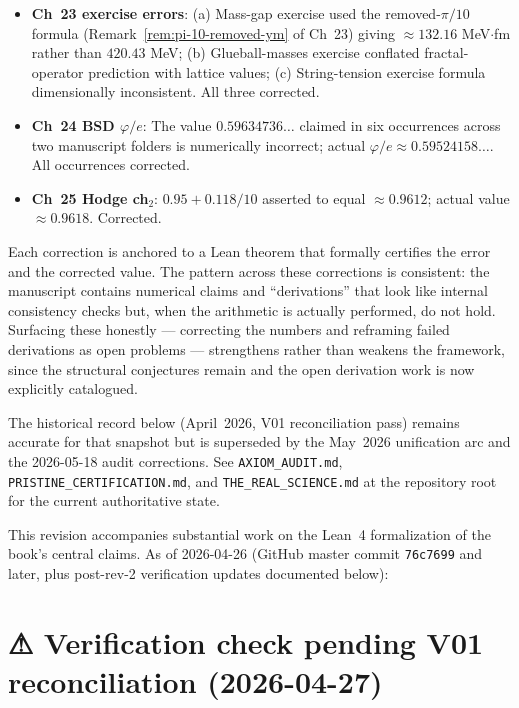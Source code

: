 \begin{itemize}
  Emergence double error (empirical ratio $0.5988 \neq (\sqrt{5}-1)/3$).
  All four corrected. (e) New $M_0$-narrowing remark inserted.
\item \textbf{Ch~23 exercise errors}: (a) Mass-gap exercise used the
  removed-$\pi/10$ formula (Remark~\ref{rem:pi-10-removed-ym} of Ch~23)
  giving $\approx 132.16$ MeV$\cdot$fm rather than $420.43$ MeV; (b)
  Glueball-masses exercise conflated fractal-operator prediction with
  lattice values; (c) String-tension exercise formula dimensionally
  inconsistent. All three corrected.
\item \textbf{Ch~24 BSD $\varphi/e$}: The value $0.59634736\ldots$
  claimed in six occurrences across two manuscript folders is
  numerically incorrect; actual $\varphi/e \approx 0.59524158\ldots$.
  All occurrences corrected.
\item \textbf{Ch~25 Hodge ch$_2$}: $0.95 + 0.118/10$ asserted to equal
  $\approx 0.9612$; actual value $\approx 0.9618$. Corrected.
\end{itemize}

\noindent Each correction is anchored to a Lean theorem that formally
certifies the error and the corrected value. The pattern across these
corrections is consistent: the manuscript contains numerical claims and
``derivations'' that look like internal consistency checks but, when
the arithmetic is actually performed, do not hold. Surfacing these
honestly --- correcting the numbers and reframing failed derivations
as open problems --- strengthens rather than weakens the framework, since
the structural conjectures remain and the open derivation work is now
explicitly catalogued.

\noindent The historical record below (April~2026, V01 reconciliation pass)
remains accurate for that snapshot but is superseded by the May~2026
unification arc and the 2026-05-18 audit corrections. See
\texttt{AXIOM\_AUDIT.md},
\texttt{PRISTINE\_CERTIFICATION.md}, and \texttt{THE\_REAL\_SCIENCE.md}
at the repository root for the current authoritative state.

\hrulefill

This revision accompanies substantial work on the Lean~4 formalization of the book's
central claims. As of 2026-04-26 (GitHub master commit \texttt{76c7699} and later, plus
post-rev-2 verification updates documented below):

\section*{⚠ Verification check pending V01 reconciliation (2026-04-27)}

